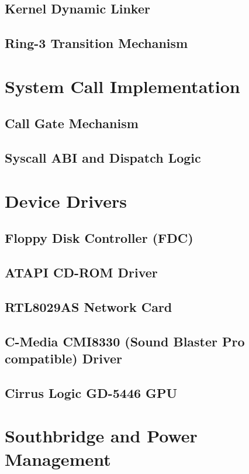 \documentclass[12pt,a4paper]{report}
\begin{document}
	\section{Kernel Dynamic Linker}
	
	\section{Ring-3 Transition Mechanism}
	
	\chapter{System Call Implementation}
	\section{Call Gate Mechanism}
	
	\section{Syscall ABI and Dispatch Logic}
	
	\chapter{Device Drivers}
	\section{Floppy Disk Controller (FDC)}
	
	\section{ATAPI CD-ROM Driver}

	\section{RTL8029AS Network Card}
	
	\section{C-Media CMI8330 (Sound Blaster Pro compatible) Driver}
	
	\section{Cirrus Logic GD-5446 GPU}
	
	\chapter{Southbridge and Power Management}
\end{document}
